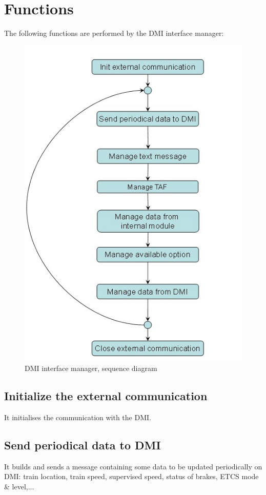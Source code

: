 \documentclass[nocc]{template/openetcs_report}
\begin{document}
\section{Functions}
The following functions are performed by the DMI interface manager:
\begin{figure}[!h]
  \centering
  \includegraphics[width=\textwidth]{image/evc_dmi_interf_manager}
  \caption{DMI interface manager, sequence diagram}
  \label{fig:DMI interface manager, sequence diagram}
\end{figure}
\subsection{Initialize the external communication}
It initialises the communication with the DMI.
\subsection{Send periodical data to DMI}
It builds and sends a message containing some data to be updated periodically on DMI: train location, train speed, supervised speed, status of brakes, ETCS mode \& level,...
\end{document}
